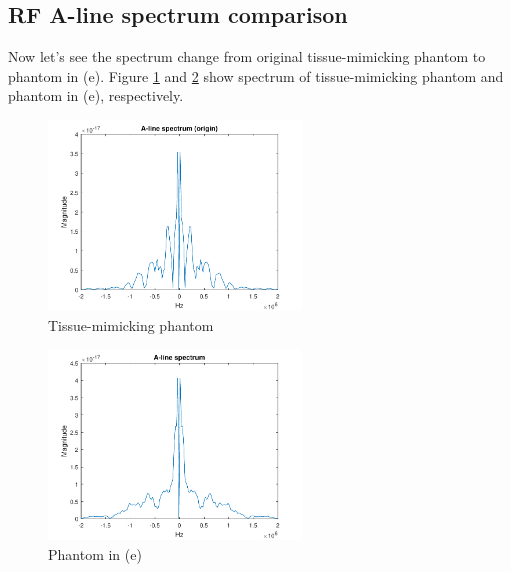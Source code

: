 \documentclass{article}
\begin{document}
\subsection{RF A-line spectrum comparison}
Now let's see the spectrum change from original tissue-mimicking phantom to phantom in (e). Figure \ref{fig:aline-origin} and 
\ref{fig:aline-e} show spectrum of tissue-mimicking phantom and phantom in (e), respectively.
\begin{figure}[H]
	\centering
	\includegraphics[width = 0.6\textwidth]{src/spect_line_ori.pdf}
	\caption{Tissue-mimicking phantom}
	\label{fig:aline-origin}
\end{figure}
\begin{figure}[H]
	\centering
	\includegraphics[width = 0.6\textwidth]{src/spect_line.pdf}
	\caption{Phantom in (e)}
	\label{fig:aline-e}
\end{figure}
\end{document}
